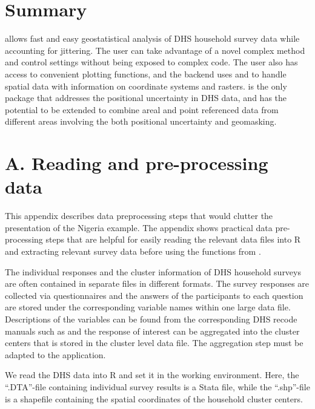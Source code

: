 \section{Summary}
 allows fast and easy geostatistical analysis of DHS household survey data while accounting for jittering. The user can take advantage of a novel complex method \citep{altay2022accounting,altay2022covariates} and control settings without being exposed to complex code. The user also has access to convenient plotting functions, and the backend uses  and  to handle spatial data with information on coordinate systems and rasters.  is the only package that  addresses the positional uncertainty in DHS data, and has the potential to be extended to combine  areal and point referenced data from different areas involving the both positional uncertainty and geomasking.



\appendix 

    

\section{A. Reading and pre-processing data \label{sec:InitialSteps}}
This appendix describes data preprocessing steps that would clutter the presentation of the Nigeria example.
The appendix shows practical data pre-processing steps that are helpful for easily reading the relevant data files into R and extracting relevant survey data before using the functions from . 

The individual responses and the cluster information of DHS household surveys are often contained in separate files in different formats. The survey responses are collected via questionnaires and the answers of the participants to each question are stored under the corresponding variable names within one large data file. Descriptions of the variables can be found from the corresponding DHS recode manuals such as \citet{fund2018demographic} and the response of interest can be aggregated into the cluster centers that is stored in the cluster level data file. The aggregation step must be adapted to the application. 

We read the DHS data into R and set it in the working environment. Here, the ``.DTA''-file containing individual survey results is a Stata file, while the ``.shp''-file is a shapefile containing the spatial coordinates of the household cluster centers.

